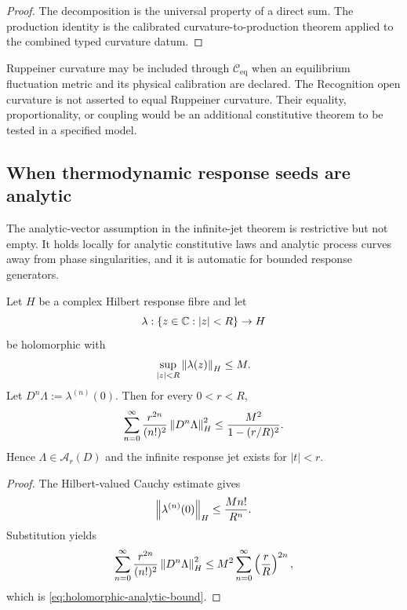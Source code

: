 \begin{proof}
The decomposition is the universal property of a direct sum.  The production identity is the calibrated curvature-to-production theorem applied to the combined typed curvature datum.
\end{proof}

\begin{remark}
Ruppeiner curvature may be included through $\mathcal C_{\mathrm{eq}}$ when an equilibrium fluctuation metric and its physical calibration are declared.  The Recognition open curvature is not asserted to equal Ruppeiner curvature.  Their equality, proportionality, or coupling would be an additional constitutive theorem to be tested in a specified model.
\end{remark}

\subsection{When thermodynamic response seeds are analytic}
\label{sec:analytic-seed-relevance}

The analytic-vector assumption in the infinite-jet theorem is restrictive but not empty.  It holds locally for analytic constitutive laws and analytic process curves away from phase singularities, and it is automatic for bounded response generators.

\begin{theorem}
\label{thm:holomorphic-response-seed}
Let $H$ be a complex Hilbert response fibre and let
\[
\lambda:\{z\in\mathbb C:|z|<R\}\to H
\]
be holomorphic with
\[
\sup_{|z|<R}\left\lVert\lambda(z)\right\rVert_H\le M.
\]
Let $D^n\Lambda:=\lambda^{(n)}(0)$.  Then for every $0<r<R$,
\begin{equation}
\sum_{n=0}^\infty
\frac{r^{2n}}{(n!)^2}
\left\lVert D^n\Lambda\right\rVert_H^2
\le
\frac{M^2}{1-(r/R)^2}.
\label{eq:holomorphic-analytic-bound}
\end{equation}
Hence $\Lambda\in\mathcal A_r(D)$ and the infinite response jet exists for $|t|<r$.
\end{theorem}

\begin{proof}
The Hilbert-valued Cauchy estimate gives
\[
\left\lVert\lambda^{(n)}(0)\right\rVert_H
\le
\frac{Mn!}{R^n}.
\]
Substitution yields
\[
\sum_{n=0}^\infty
\frac{r^{2n}}{(n!)^2}
\left\lVert D^n\Lambda\right\rVert_H^2
\le
M^2\sum_{n=0}^\infty\left(\frac rR\right)^{2n},
\]
which is \eqref{eq:holomorphic-analytic-bound}.
\end{proof}

